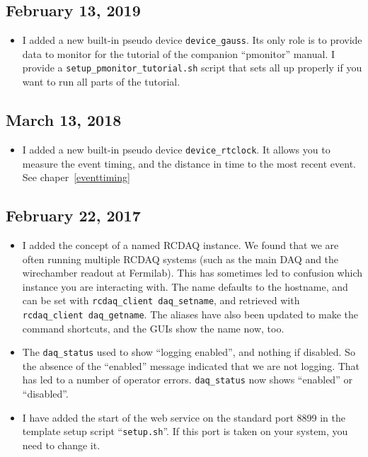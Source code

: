 \documentclass{article}[11pt]
\begin{document}
\subsection{February 13, 2019}
\begin{itemize}
\item I added a new built-in pseudo device \verb|device_gauss|.  Its
  only role is to provide data to monitor for the tutorial of the
  companion ``pmonitor'' manual. I provide a
  \verb|setup_pmonitor_tutorial.sh| script that sets all up properly if you want
  to run all parts of the tutorial.
\end{itemize}


\subsection{March 13, 2018}
\begin{itemize}
\item I added a new built-in pseudo device \verb|device_rtclock|.  It
  allows you to measure the event timing, and the distance in time to
  the most recent event. See chaper~\ref{eventtiming}
\end{itemize}

\subsection{February 22, 2017}
\begin{itemize}
\item I added the concept of a named RCDAQ instance. We found that we
  are often running multiple RCDAQ systems (such as the main DAQ and
  the wirechamber readout at Fermilab). This has sometimes led to
  confusion which instance you are interacting with. The name
  defaults to the hostname, and can be set with
  \verb|rcdaq_client daq_setname|, and retrieved with
  \verb|rcdaq_client daq_getname|.  The aliases have also been
  updated to make the command shortcuts, and the GUIs show the name
  now, too. 
\item The \verb|daq_status| used to show ``logging enabled'', and nothing if
  disabled. So the absence of the ``enabled'' message indicated
  that we are not logging. That has led to a number of operator
  errors. \verb|daq_status| now shows ``enabled'' or ``disabled''. 
\item I have added the start of the web service on the standard port
  8899 in the template setup script ``\verb|setup.sh|''. If this port
  is taken on your system, you need to change it. 

\end{itemize}
\end{document}
